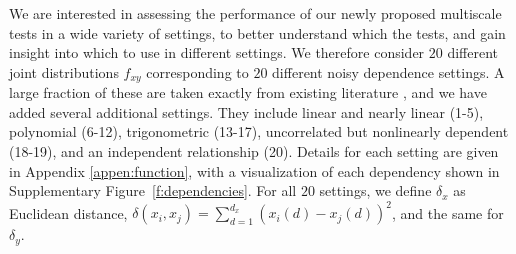 \documentclass[11pt]{article}
\providecommand{\sct}[1]{{\sc \texttt{#1}}}
\newcommand{\Mgc}{\sct{Mgc}}
\newcommand{\Mgcm}{\sct{Mgc$_M$}}
\newcommand{\Hhg}{\sct{Hhg}}
\newcommand{\Dcorr}{\sct{Dcorr}}
\newcommand{\Mcorr}{\sct{Mcorr}}
\newcommand{\Mantel}{\sct{Mantel}}
\begin{document}
We are interested in assessing the performance of our newly proposed multiscale tests in a wide variety of settings, to better understand which the tests, and gain insight into which to use in different settings.  
We therefore consider $20$ different joint distributions $f_{xy}$ corresponding to $20$ different noisy dependence settings. A large fraction of these are taken exactly from existing literature \cite{SzekelyRizzoBakirov2007, SimonTibshirani2012, GorfineHellerHeller2012, HellerGorfine2013}, and we have added several additional settings.  They include
linear and nearly linear  (1-5),
polynomial   (6-12),
trigonometric (13-17),
uncorrelated but nonlinearly dependent  (18-19),
and an independent relationship (20).
Details for each setting are given in Appendix \ref{appen:function}, with a visualization of each dependency shown in Supplementary Figure~\ref{f:dependencies}. For all $20$ settings, we define  $\delta_x$  as Euclidean distance,  $\delta(x_i,x_j) = \sum_{d=1}^{d_x} (x_i(d) - x_j(d))^2$, and the same for $\delta_y$.
\end{document}
